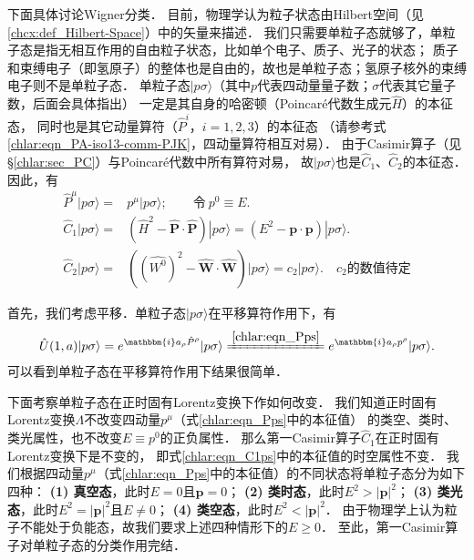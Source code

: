下面具体讨论Wigner分类．
目前，物理学认为粒子状态由Hilbert空间（见\ref{chcx:def_Hilbert-Space}）中的矢量来描述．
我们只需要单粒子态就够了，单粒子态是指无相互作用的自由粒子状态，比如单个电子、质子、光子的状态；
质子和束缚电子（即氢原子）的整体也是自由的，故也是单粒子态；氢原子核外的束缚电子则不是单粒子态．
单粒子态$|p\sigma\rangle$（其中$p$代表四动量量子数；$\sigma$代表其它量子数，后面会具体指出）
一定是其自身的哈密顿（Poincar\'e代数生成元$\hat{H}$）的本征态，
同时也是其它动量算符（$\hat{P}^i$，$i=1,2,3$）的本征态
（请参考式\eqref{chlar:eqn_PA-iso13-comm-PJK}，四动量算符相互对易）．
由于Casimir算子（见\S\ref{chlar:sec_PC}）与Poincar\'e代数中所有算符对易，
故$|p\sigma\rangle$也是$\hat{C}_1$、$\hat{C}_2$的本征态．因此，有
\begin{align}
	\hat{P}^\mu |p\sigma\rangle =& p^\mu |p\sigma\rangle;\qquad \text{令}\ p^0 \equiv E . \label{chlar:eqn_Pps}\\
	\hat{C}_1 |p\sigma\rangle = & (\hat{H}^2 - \boldsymbol{\hat{P}}\cdot \boldsymbol{\hat{P}}) |p\sigma\rangle
	= (E^2 -\boldsymbol{p}\cdot \boldsymbol{p}) |p\sigma\rangle . \label{chlar:eqn_C1ps} \\
	\hat{C}_2 |p\sigma\rangle = & \left(\left(\hat{W^0}\right)^2 - \boldsymbol{\hat{W}}
	\cdot \boldsymbol{\hat{W}}\right) |p\sigma\rangle
	= c_2 |p\sigma\rangle . \quad c_2\text{的数值待定}  \label{chlar:eqn_C2ps}
\end{align}




首先，我们考虑平移．单粒子态$|p\sigma\rangle$在平移算符作用下，有
\begin{align}
	\hat{U}(1,a) |p\sigma\rangle = e^{\mathbbm{i}a_\rho \hat{P}^\rho} |p\sigma\rangle
	\xlongequal{\ref{chlar:eqn_Pps}} e^{\mathbbm{i}a_\rho p^\rho} |p\sigma\rangle .
\end{align}
可以看到单粒子态在平移算符作用下结果很简单．

下面考察单粒子态在正时固有Lorentz变换下作如何改变．
我们知道正时固有Lorentz变换$\Lambda$不改变四动量$p^\mu$（式\eqref{chlar:eqn_Pps}中的本征值）
的类空、类时、类光属性，也不改变$E\equiv p^0$的正负属性．
那么第一Casimir算子$\hat{C}_1$在正时固有Lorentz变换下是不变的，
即式\eqref{chlar:eqn_C1ps}中的本征值的时空属性不变．
我们根据四动量$p^\mu$（式\eqref{chlar:eqn_Pps}中的本征值）的不同状态将单粒子态分为如下四种：
{\heiti \bfseries (1) 真空态}，此时$E=0$且$\boldsymbol{p}=0$；
{\heiti \bfseries (2) 类时态}，此时$E^2>|\boldsymbol{p}|^2$；
{\heiti \bfseries (3) 类光态}，此时$E^2=|\boldsymbol{p}|^2$且$E \neq 0$；
{\heiti \bfseries (4) 类空态}，此时$E^2<|\boldsymbol{p}|^2$．
由于物理学上认为粒子不能处于负能态，故我们要求上述四种情形下的$E\geqslant 0$．
至此，第一Casimir算子对单粒子态的分类作用完结．

